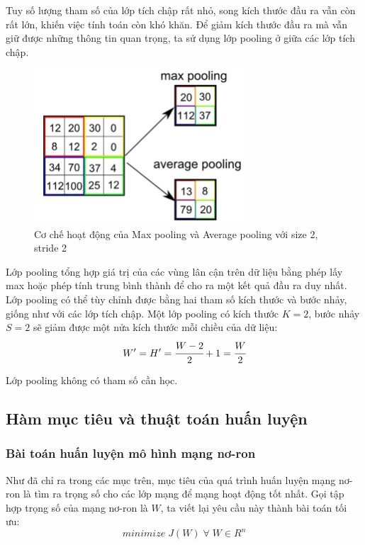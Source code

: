 \documentclass[12pt]{extreport}
\begin{document}
Tuy số lượng tham số của lớp tích chập rất nhỏ, song kích thước đầu ra vẫn còn rất lớn, khiến việc tính toán còn khó khăn. Để giảm kích thước đầu ra mà vẫn giữ được những thông tin quan trọng, ta sử dụng lớp pooling ở giữa các lớp tích chập.

\begin{figure}[H]
    \centering
    \includegraphics[width=0.7\textwidth]{figure9.jpg}
    \caption{Cơ chế hoạt động của Max pooling và Average pooling với size 2, stride 2}
\end{figure}

Lớp pooling tổng hợp giá trị của các vùng lân cận trên dữ liệu bằng phép lấy max hoặc phép tính trung bình thành để cho ra một kết quả đầu ra duy nhất. Lớp pooling có thể tùy chỉnh được bằng hai tham số kích thước và bước nhảy, giống như với các lớp tích chập. Một lớp pooling có kích thước $ K = 2 $, bước nhảy $ S = 2 $ sẽ giảm được một nửa kích thước mỗi chiều của dữ liệu:
$$  W' = H' = \cfrac{W - 2}{2} + 1 = \cfrac{W}{2} $$

Lớp pooling không có tham số cần học.

\subsection{Hàm mục tiêu và thuật toán huấn luyện}

\subsubsection{Bài toán huấn luyện mô hình mạng nơ-ron}

Như đã chỉ ra trong các mục trên, mục tiêu của quá trình huấn luyện mạng nơ-ron là tìm ra trọng số cho các lớp mạng để mạng hoạt động tốt nhất. Gọi tập hợp trọng số của mạng nơ-ron là $ W $, ta viết lại yêu cầu này thành bài toán tối ưu:
$$ minimize \; J(W) \; \forall \; W \in R^{n} $$
\end{document}
